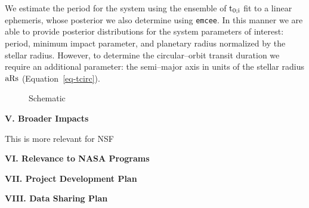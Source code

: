We estimate the period for the system using the ensemble of ${\rm
  t_{0;i}}$ fit to a linear ephemeris, whose posterior we also
determine using {\tt emcee}.  In this manner we are able to provide
posterior distributions for the system parameters of interest: period,
minimum impact parameter, and planetary radius normalized by the
stellar radius.  However, to determine the circular--orbit transit
duration we require an additional parameter: the semi--major axis in
units of the stellar radius ${\rm aRs}$ (Equation~\ref{eq-tcirc}).

\begin{figure*}[t] 
\begin{center} 
\caption{Schematic}
\label{fig-schem} 
\end{center} 
\end{figure*}

\bigskip
\centerline{\bf V. Broader Impacts}
\smallskip

This is more relevant for NSF

\bigskip
\centerline{\bf VI. Relevance to NASA Programs}
\smallskip

\bigskip
\centerline{\bf VII. Project Development Plan}
\smallskip

\bigskip
\centerline{\bf VIII. Data Sharing Plan}
\smallskip
